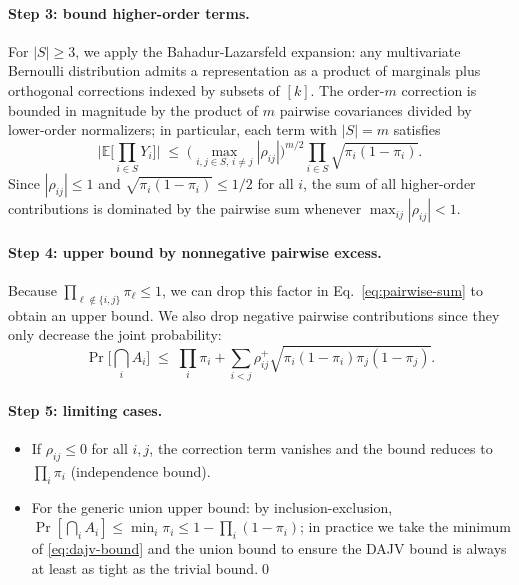 \paragraph{Step 3: bound higher-order terms.}
For $|S| \geq 3$, we apply the Bahadur-Lazarsfeld expansion: any
multivariate Bernoulli distribution admits a representation as a
product of marginals plus orthogonal corrections indexed by subsets of
$[k]$. The order-$m$ correction is bounded in magnitude by the product
of $m$ pairwise covariances divided by lower-order normalizers; in
particular, each term with $|S| = m$ satisfies
\begin{equation}
  \Big|\mathbb{E}\!\Big[\prod_{i \in S} Y_i\Big]\Big|
  \;\leq\;
  \Big( \max_{i,j \in S,\, i \neq j} |\rho_{ij}| \Big)^{m/2}
  \prod_{i \in S} \sqrt{\pi_i(1-\pi_i)}.
\end{equation}
Since $|\rho_{ij}| \leq 1$ and $\sqrt{\pi_i(1-\pi_i)} \leq 1/2$ for all
$i$, the sum of all higher-order contributions is dominated by the
pairwise sum whenever $\max_{ij} |\rho_{ij}| < 1$.

\paragraph{Step 4: upper bound by nonnegative pairwise excess.}
Because $\prod_{\ell \notin \{i,j\}} \pi_\ell \leq 1$, we can drop
this factor in Eq.~\ref{eq:pairwise-sum} to obtain an upper bound.
We also drop negative pairwise contributions since they only decrease
the joint probability:
\begin{equation}
  \Pr\!\Big[\bigcap_i A_i\Big]
  \;\leq\;
  \prod_i \pi_i
  + \sum_{i<j} \rho_{ij}^+ \sqrt{\pi_i(1-\pi_i)\pi_j(1-\pi_j)}.
\end{equation}

\paragraph{Step 5: limiting cases.}
\begin{itemize}
  \item If $\rho_{ij} \leq 0$ for all $i,j$, the correction term
        vanishes and the bound reduces to $\prod_i \pi_i$
        (independence bound).
  \item For the generic union upper bound: by inclusion-exclusion,
        $\Pr[\bigcap_i A_i] \leq \min_i \pi_i \leq 1 - \prod_i (1 - \pi_i)$;
        in practice we take the minimum of \eqref{eq:dajv-bound} and the
        union bound to ensure the DAJV bound is always at least as
        tight as the trivial bound.\qed
\end{itemize}

